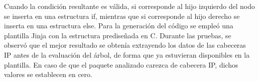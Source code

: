Cuando la condición resultante es válida, si corresponde al hijo izquierdo del nodo se inserta en una estructura if, mientras que si corresponde al hijo derecho se inserta en una estructura else. Para la generación del código se empleó una plantilla Jinja con la estructura prediseñada en C. Durante las pruebas, se observó que el mejor resultado se obtenía extrayendo los datos de las cabeceras IP antes de la evaluación del árbol, de forma que ya estuvieran disponibles en la plantilla. En caso de que el paquete analizado carezca de cabecera IP, dichos valores se establecen en cero.
